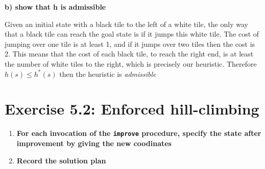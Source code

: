 \documentclass[12pt,a4paper]{article}
\begin{document}
	\textbf{b) show that h is admissible}
	\begin{addmargin}[1em]{1em}%
		\quad Given an initial state with a black tile to the left of a white
		tile, the only way that a black tile can reach the goal state is if
		it jumps this white tile. The cost of jumping over one tile is 
		at least 1, and if it jumps over two tiles then the cost is 2. 
		This means that the cost of each black tile, to reach the right end,
		is at least the number of white tiles to the right, which is 
		precisely our heuristic. Therefore $h(s) \leq h^*(s) $
		then the heuristic is \emph{admissible}
	\end{addmargin}

\section*{Exercise 5.2: Enforced hill-climbing}
\begin{enumerate}[label=\alph*)]
	\item \textbf{For each invocation of the 
			\texttt{improve} procedure, specify
			the state after improvement by giving the new coodinates}
	\item \textbf{Record the solution plan}
\end{enumerate}
\end{document}
